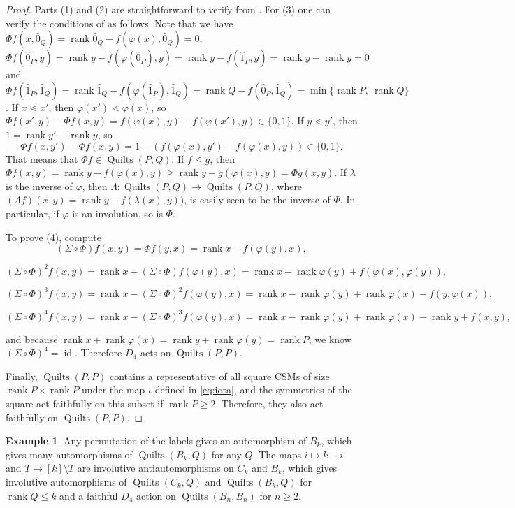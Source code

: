 \documentclass[12pt]{amsart}
\numberwithin{equation}{section}
\theoremstyle{definition}
\newtheorem{example}[theorem]{Example}
\newcommand{\id}{\operatorname{id}}
\newcommand{\quilt}{\operatorname{Quilts}}
\newcommand{\rank}{\operatorname{rank}}
\begin{document}
\begin{proof}
 Parts (1) and (2) are straightforward to verify from
. For (3) one can verify the conditions of
 as follows. Note that we have $\Phi f(x,\hat 0_Q) =
\rank \hat 0_Q - f(\varphi(x), \hat 0_Q) = 0$, $\Phi f(\hat 0_P,y) =
\rank y - f(\varphi(\hat 0_P),y) = \rank y - f(\hat 1_P,y) = \rank y -
\rank y = 0$ and $\Phi f(\hat 1_P, \hat 1_Q) = \rank \hat 1_Q -
f(\varphi(\hat 1_P),\hat 1_Q) = \rank Q - f(\hat 0_{P}, \hat 1_Q) =
\min \{\rank P,\ \rank Q\}$. If $x \lessdot x'$, then $\varphi(x')
\lessdot \varphi(x)$, so $\Phi f(x',y) - \Phi f(x, y) = f(\varphi(x),
y) - f(\varphi(x'), y) \in \{0,1\}$. If $y \lessdot y'$, then
$1=\rank y' - \rank y$, so
\[
\Phi f(x,y') - \Phi f(x,y) = 1 - (f(\varphi(x), y') - f(\varphi(x),
y)) \in \{0,1\}.
\]
That means that $\Phi f \in \quilt(P,Q)$. If $f \leq g$, then $\Phi
f(x,y) = \rank y - f(\varphi(x),y) \geq \rank y - g(\varphi(x),y) =
\Phi g(x,y)$. If $\lambda$ is the inverse of $\varphi$, then $\Lambda
\colon \quilt(P,Q) \to \quilt(P,Q)$, where $(\Lambda f)(x,y) = \rank y
- f(\lambda(x),y))$, is easily seen to be the inverse of $\Phi$. In
particular, if $\varphi$ is an involution, so is $\Phi$.

To prove (4), compute $$(\Sigma \circ \Phi) f(x,y) = \Phi f(y,x) =
\rank x - f(\varphi(y), x),$$

$$(\Sigma \circ \Phi)^2 f(x,y) = \rank x - (\Sigma \circ \Phi)
f(\varphi(y),x) = \rank x - \rank \varphi(y) +
f(\varphi(x),\varphi(y)),$$

$$(\Sigma \circ \Phi)^3 f(x,y) = \rank x - (\Sigma \circ \Phi)^2
f(\varphi(y),x) = \rank x - \rank \varphi(y) + \rank \varphi(x) -
f(y,\varphi(x)),$$

$$(\Sigma \circ \Phi)^4 f(x,y) = \rank x - (\Sigma \circ \Phi)^3
f(\varphi(y),x) = \rank x - \rank \varphi(y) + \rank \varphi(x) -
\rank y + f(x,y),$$

\noindent and because $\rank x + \rank \varphi(x) = \rank y
+ \rank \varphi(y) = \rank P$, we know $(\Sigma \circ \Phi)^4 =
\id$. Therefore $D_4$ acts on $\quilt(P,P)$.

Finally, $\quilt(P,P)$ contains a representative of all square CSMs of
size $\rank P \times \rank P$ under the map $\iota$ defined in \eqref{eq:iota}, and the symmetries of the square act
faithfully on this subset if $\rank P \geq 2$.  Therefore, they also act faithfully on
$\quilt(P,P)$.
\end{proof}

\begin{example}
 Any permutation of the labels gives an automorphism of $B_k$, which gives many automorphisms of $\quilt(B_k,Q)$ for any $Q$. The maps $i \mapsto k - i$ and $T \mapsto [k] \setminus T$ are involutive antiautomorphisms on $C_k$ and $B_k$, which gives involutive automorphisms of $\quilt(C_k,Q)$ and $\quilt(B_k,Q)$ for $\rank Q \leq k$ and a faithful $D_4$ action on $\quilt(B_n,B_n)$ for $n \geq 2$.
\end{example}
\end{document}

